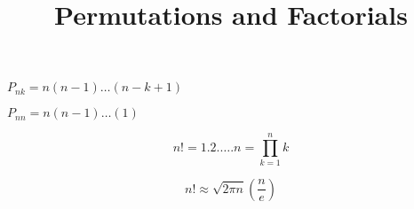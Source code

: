 \documentclass[12pt]{article}
\title{Permutations and Factorials}
\begin{document}
\maketitle

$ P_{nk} = n(n-1)\ldots(n-k+1)$

$ P_{nn} = n(n-1)\ldots(1)$

$$n! = 1.2. \ldots . n = \prod_{k=1}^n{k}$$

$$ n! \approx \sqrt{2\pi n}\left(\frac{n}{e}\right)$$
\end{document}
